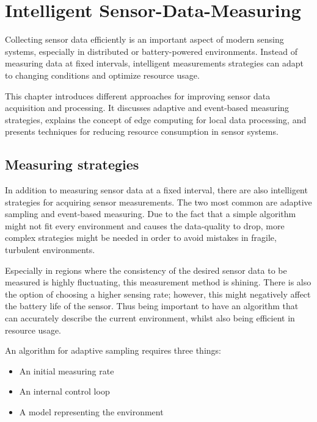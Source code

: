 \chapter{Intelligent Sensor-Data-Measuring}
Collecting sensor data efficiently is an important aspect of modern sensing systems, especially in distributed or battery-powered environments. Instead of measuring data at fixed intervals, intelligent measurements strategies can adapt to changing conditions and optimize resource usage.

This chapter introduces different approaches for improving sensor data acquisition and processing. It discusses adaptive and event-based measuring strategies, explains the concept of edge computing for local data processing, and presents techniques for reducing resource consumption in sensor systems.

\section{Measuring strategies}\label{title:intelligent-strategies}
In addition to measuring sensor data at a fixed interval, there are also intelligent strategies for acquiring sensor measurements. The two most common are adaptive sampling and event-based measuring. Due to the fact that a simple algorithm might not fit every environment and causes the data-quality to drop, more complex strategies might be needed in order to avoid mistakes in fragile, turbulent environments.

Especially in regions where the consistency of the desired sensor data to be measured is highly fluctuating, this measurement method is shining. There is also the option of choosing a higher sensing rate; however, this might negatively affect the battery life of the sensor. Thus being important to have an algorithm that can accurately describe the current environment, whilst also being efficient in resource usage.

An algorithm for adaptive sampling requires three things:
\begin{itemize}
    \item An initial measuring rate
    \item An internal control loop
    \item A model representing the environment
\end{itemize}

